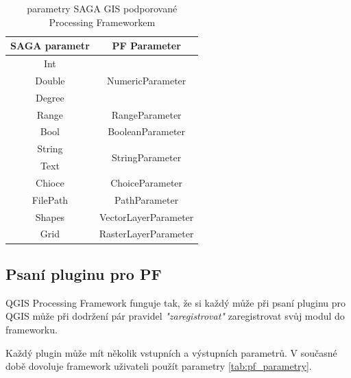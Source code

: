 \begin{table}	
	\centering
	\begin{tabular}{|c|c|}
		\hline
		\textbf{SAGA parametr} & \textbf{PF Parameter} \\
		\hline
		\hline
		Int & \multirow{3}{*}{NumericParameter}\\
		Double & \\
		Degree & \\
		\hline				
		Range & RangeParameter\\	
		\hline
		Bool & BooleanParameter\\		
		\hline
		String & \multirow{2}{*}{StringParameter}\\
		Text & \\
		\hline
		Chioce & ChoiceParameter\\
		\hline
		FilePath & PathParameter\\
		\hline
		Shapes & VectorLayerParameter\\
		\hline
		Grid & RasterLayerParameter\\		
		\hline	
	\end{tabular}
	\caption{parametry SAGA GIS podporované Processing Frameworkem}
	\label{tab:saga_parameters}
\end{table}



\subsection{Psaní pluginu pro PF}

QGIS Processing Framework funguje tak, že si každý může při psaní pluginu pro QGIS může při dodržení pár pravidel \textit{"zaregistrovat"} zaregistrovat svůj modul do frameworku. 

Každý plugin může mít několik vstupních a výstupních parametrů. V současné době dovoluje framework uživateli použít parametry \ref{tab:pf_parametry}.

